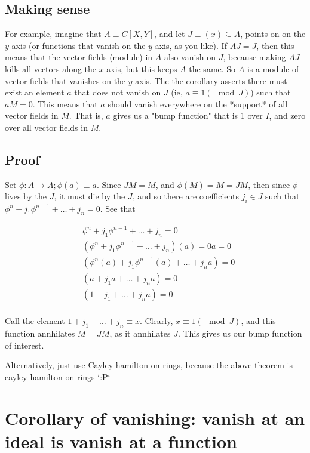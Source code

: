 \documentclass{book}
\begin{document}
\subsection{Making sense}
For example, imagine that $A \equiv C[X, Y]$, and let $J \equiv (x) \subseteq A$, points on
on the $y$-axis (or functions that vanish on the $y$-axis, as you like). If $AJ = J$, then
this means that the vector fields (module) in $A$ also vanish on $J$, because making $AJ$ kills all vectors
along the $x$-axis, but this keeps $A$ the same.
So $A$ is a module of vector fields that vanishes on the $y$-axis. 
The the corollary asserts there must exist an element $a$ that does not vanish on $J$ (ie, $a \equiv 1 (\mod J)$)
such that $aM = 0$. This means that $a$ should vanish everywhere on the *support* of all vector
fields in $M$. That is, $a$ gives us a "bump function" that is 1 over $I$, and zero over all vector fields
in $M$.

\subsection{Proof}
Set $\phi: A \rightarrow A; \phi(a) \equiv a$. Since $JM = M$, and $\phi(M) = M = JM$, then since $\phi $ lives by the $J$,
it must die by the $J$, and so there are coefficients $j_i \in J$ such that
$\phi^n + j_1 \phi^{n-1} + \dots + j_n = 0$. See that

\begin{align*}
&\phi^n + j_1 \phi^{n-1} + \dots + j_n = 0 \\
&(\phi^n + j_1 \phi^{n-1} + \dots + j_n)(a) = 0a = 0 \\
&(\phi^{n}(a) + j_1 \phi^{n-1}(a) + \dots + j_n a) = 0 \\
&(a + j_1 a + \dots + j_n a) = 0 \\
&(1 + j_1 + \dots + j_n a) = 0 \\
\end{align*}

Call the element $1 + j_1 + \dots + j_n \equiv x$. Clearly, $x \equiv 1 (\mod J)$, and 
this function annhilates $M = JM$, as it annhilates $J$. This gives us our
bump function of interest.

Alternatively, just use Cayley-hamilton on rings, because the above theorem is cayley-hamilton on rings `:P`

\section{Corollary of vanishing: vanish at an ideal is vanish at a function}
\end{document}
